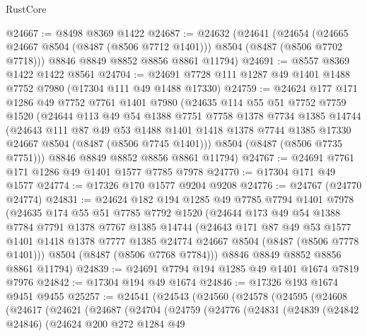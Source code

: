 \begin{lexlean}{RustCore}
\begin{coremodule}
@24667 := @8498 @8369 @1422
@24687 := @24632
    (@24641
      (@24654 (@24665 @24667 @8504 (@8487 (@8506 @7712 @1401))) @8504 (@8487 (@8506 @7702 @7718)))
      @8846
      @8849
      @8852
      @8856
      @8861
      @11794)
@24691 := @8557 @8369 @1422 @1422 @8561
@24704 := @24691 @7728 @111 @1287 @49 @1401 @1488 @7752 @7980 (@17304 @111 @49 @1488 @17330)
@24759 := @24624
    @177
    @171
    @1286
    @49
    @7752
    @7761
    @1401
    @7980
    (@24635
      @114
      @55
      @51
      @7752
      @7759
      @1520
      (@24644
        @113
        @49
        @54
        @1388
        @7751
        @7758
        @1378
        @7734
        @1385
        @14744
        (@24643
          @111
          @87
          @49
          @53
          @1488
          @1401
          @1418
          @1378
          @7744
          @1385
          @17330
          @24667
          @8504
          (@8487 (@8506 @7745 @1401)))
        @8504
        (@8487 (@8506 @7735 @7751)))
      @8846
      @8849
      @8852
      @8856
      @8861
      @11794)
@24767 := @24691 @7761 @171 @1286 @49 @1401 @1577 @7785 @7978
@24770 := @17304 @171 @49 @1577
@24774 := @17326 @170 @1577 @9204 @9208
@24776 := @24767 (@24770 @24774)
@24831 := @24624
    @182
    @194
    @1285
    @49
    @7785
    @7794
    @1401
    @7978
    (@24635
      @174
      @55
      @51
      @7785
      @7792
      @1520
      (@24644
        @173
        @49
        @54
        @1388
        @7784
        @7791
        @1378
        @7767
        @1385
        @14744
        (@24643
          @171
          @87
          @49
          @53
          @1577
          @1401
          @1418
          @1378
          @7777
          @1385
          @24774
          @24667
          @8504
          (@8487 (@8506 @7778 @1401)))
        @8504
        (@8487 (@8506 @7768 @7784)))
      @8846
      @8849
      @8852
      @8856
      @8861
      @11794)
@24839 := @24691 @7794 @194 @1285 @49 @1401 @1674 @7819 @7976
@24842 := @17304 @194 @49 @1674
@24846 := @17326 @193 @1674 @9451 @9455
@25257 := @24541
    (@24543
      (@24560
        (@24578
          (@24595
            (@24608
              (@24617
                (@24621
                  (@24687
                    (@24704
                      (@24759
                        (@24776
                          (@24831
                            (@24839
                              (@24842 @24846)
                              (@24624
                                @200
                                @272
                                @1284
                                @49

\end{coremodule}
\end{lexlean}

